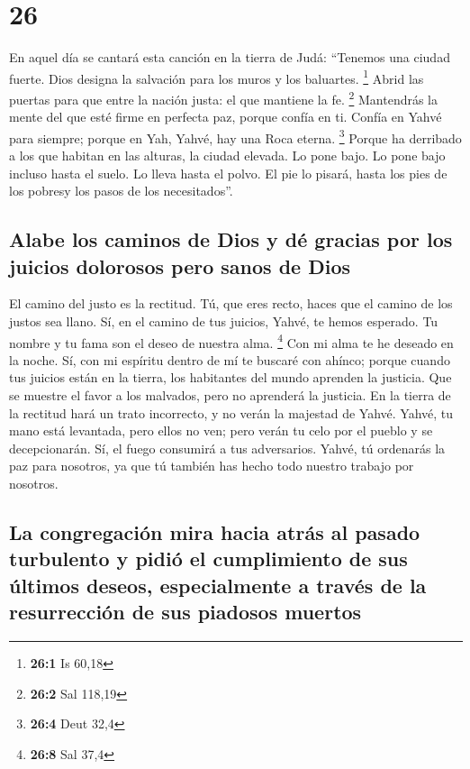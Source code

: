 \hypertarget{section-25}{%
\section{26}\label{section-25}}

 En aquel día se cantará esta canción en la tierra de
Judá: ``Tenemos una ciudad fuerte. Dios designa la salvación para los
muros y los baluartes. \footnote{\textbf{26:1} Is 60,18} 
Abrid las puertas para que entre la nación justa: el que mantiene la fe.
\footnote{\textbf{26:2} Sal 118,19}  Mantendrás la mente
del que esté firme en perfecta paz, porque confía en ti. 
Confía en Yahvé para siempre; porque en Yah, Yahvé, hay una Roca eterna.
\footnote{\textbf{26:4} Deut 32,4}  Porque ha derribado a
los que habitan en las alturas, la ciudad elevada. Lo pone bajo. Lo pone
bajo incluso hasta el suelo. Lo lleva hasta el polvo.  El
pie lo pisará, hasta los pies de los pobresy los pasos de los
necesitados''.

\hypertarget{alabe-los-caminos-de-dios-y-duxe9-gracias-por-los-juicios-dolorosos-pero-sanos-de-dios}{%
\subsection{Alabe los caminos de Dios y dé gracias por los juicios
dolorosos pero sanos de
Dios}\label{alabe-los-caminos-de-dios-y-duxe9-gracias-por-los-juicios-dolorosos-pero-sanos-de-dios}}

 El camino del justo es la rectitud. Tú, que eres recto,
haces que el camino de los justos sea llano.  Sí, en el
camino de tus juicios, Yahvé, te hemos esperado. Tu nombre y tu fama son
el deseo de nuestra alma. \footnote{\textbf{26:8} Sal 37,4}
 Con mi alma te he deseado en la noche. Sí, con mi
espíritu dentro de mí te buscaré con ahínco; porque cuando tus juicios
están en la tierra, los habitantes del mundo aprenden la justicia.
 Que se muestre el favor a los malvados, pero no
aprenderá la justicia. En la tierra de la rectitud hará un trato
incorrecto, y no verán la majestad de Yahvé.  Yahvé, tu
mano está levantada, pero ellos no ven; pero verán tu celo por el pueblo
y se decepcionarán. Sí, el fuego consumirá a tus adversarios.
 Yahvé, tú ordenarás la paz para nosotros, ya que tú
también has hecho todo nuestro trabajo por nosotros.

\hypertarget{la-congregaciuxf3n-mira-hacia-atruxe1s-al-pasado-turbulento-y-pidiuxf3-el-cumplimiento-de-sus-uxfaltimos-deseos-especialmente-a-travuxe9s-de-la-resurrecciuxf3n-de-sus-piadosos-muertos}{%
\subsection{La congregación mira hacia atrás al pasado turbulento y
pidió el cumplimiento de sus últimos deseos, especialmente a través de
la resurrección de sus piadosos
muertos}\label{la-congregaciuxf3n-mira-hacia-atruxe1s-al-pasado-turbulento-y-pidiuxf3-el-cumplimiento-de-sus-uxfaltimos-deseos-especialmente-a-travuxe9s-de-la-resurrecciuxf3n-de-sus-piadosos-muertos}}

